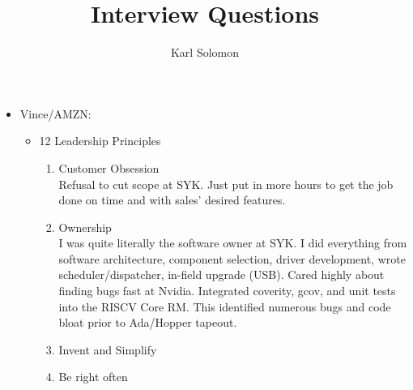 \documentclass{article}
\begin{document}
\selectfont
\title{Interview Questions}
\author{Karl Solomon}

\maketitle
\small
\begin{itemize}
	\item Vince/AMZN:
	      \begin{itemize}
		      \item 12 Leadership Principles
				  \begin{enumerate}
				  	\item Customer Obsession \\
						Refusal to cut scope at SYK. Just put in more hours to get the job done on time and with sales' desired features.
				  	\item Ownership \\
						I was quite literally the software owner at SYK. I did everything from software architecture, component selection, driver development, wrote scheduler/dispatcher, in-field upgrade (USB).
						Cared highly about finding bugs fast at Nvidia. Integrated coverity, gcov, and unit tests into the RISCV Core RM. This identified numerous bugs and code bloat prior to Ada/Hopper tapeout.
				  	\item Invent and Simplify \\
				  	\item Be right often \\ 


\end{enumerate}
\end{itemize}
\end{itemize}
\end{document}
